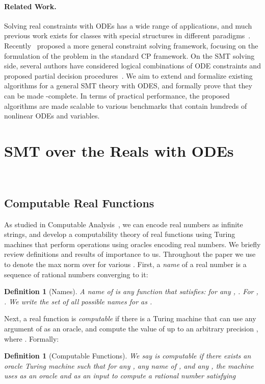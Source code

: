 \documentclass[12pt]{article}
\newtheorem{definition}[theorem]{Definition}
\begin{document}
\paragraph{Related Work.} 
Solving real constraints with ODEs has a wide range of applications, and much previous work exists for classes with special structures in different paradigms~\cite{DBLP:conf/cp/CruzB03,Granvilliers:2005:PEU:1039891.1039931,Lin07guaranteedstate}. Recently~\cite{DBLP:conf/cp/GoldsztejnMEH10} proposed a more general constraint solving framework, focusing on the formulation of the problem in the standard CP framework. On the SMT solving side, several authors have considered logical combinations of ODE constraints and proposed partial decision procedures~\cite{Eggers2008,Eggers2011,DBLP:journals/sttt/IshiiUH11}. We aim to extend and formalize existing algorithms for a general SMT theory with ODES, and formally prove that they can be made -complete. In terms of practical performance, the proposed algorithms are made scalable to various benchmarks that contain hundreds of nonlinear ODEs and variables. 

\section{SMT over the Reals with ODEs}~\label{language}
\vspace{-0.8cm}
\subsection{Computable Real Functions}
As studied in Computable Analysis~\cite{CAbook,Kobook}, we can encode real numbers as infinite strings, and develop a computability theory of real functions using Turing machines that perform operations using oracles encoding real numbers.  We briefly review definitions and results of importance to us. Throughout the paper we use  to denote the max norm  over  for various . First, a {\em name} of a real number is a sequence of rational numbers converging to it:
\begin{definition}[Names]
A name of  is any function  that satisfies:  for any , . For , . We write the set of all possible names for  as .
\end{definition}

Next, a real function  is {\em computable} if there is a Turing machine that can use any argument  of  as an oracle, and compute the value of  up to an arbitrary precision , where . Formally: 
\begin{definition}[Computable Functions]\label{comp_functions}
We say  is computable if there exists an oracle Turing machine  such that for any , any name  of , and any , the machine uses  as an oracle and  as an input to compute a rational number  satisfying 
\end{definition}
\end{document}
